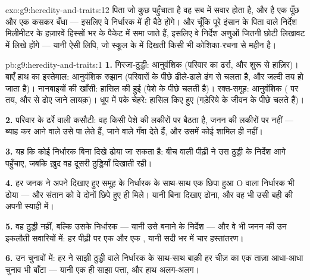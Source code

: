 \begin{solution}{exo:g9:heredity-and-traits:12}
पिता जो कुछ पहुँचाता है वह सब  में सवार होता है, और  है
एक पूँछ और एक कसकर बँधा  --- इसलिए वे निर्धारक  में ही
बैठे होंगे। और चूँकि पूरे इंसान के पिता वाले निर्देश मिलीमीटर के
हज़ारवें हिस्सों भर के पैकेट में समा जाते हैं, इसलिए वे निर्देश अणुओं
जितनी छोटी लिखावट में लिखे होंगे --- यानी ऐसी लिपि, जो स्कूल के
 में दिखती किसी भी कोशिका-रचना से महीन है।
\end{solution}

\begin{solution}{pb:g9:heredity-and-traits:1}
\textbf{1.} गिरजा-ठुड्डी: आनुवंशिक (परिवार का ढर्रा, और शुरू से
हाज़िर)। बाएँ हाथ का इस्तेमाल: आनुवंशिक रुझान (परिवारों के पीछे ढीले-ढाले
ढंग से चलता है, और जल्दी तय हो जाता है)। नानबाइयों की खाँसी: हासिल की हुई
(पेशे के पीछे चलती है)। रक्त-समूह: आनुवंशिक ( पर तय, और 
से ढोए जाने लायक़)। धूप में पके चेहरे: हासिल किए हुए (गड़ेरिये के जीवन के
पीछे चलते हैं)।

\textbf{2.} परिवार के ढर्रे वाली कसौटी: वह  किसी पेशे की लकीरों पर
बैठता है, जनन की लकीरों पर नहीं --- ब्याह कर आने वाले उसे पा लेते हैं,
जाने वाले गँवा देते हैं, और उसमें कोई  शामिल ही नहीं।

\textbf{3.} यह कि कोई निर्धारक बिना दिखे ढोया जा सकता है: बीच वाली पीढ़ी
ने उस ठुड्डी के निर्देश आगे पहुँचाए, जबकि ख़ुद वह दूसरी ठुड्डियाँ दिखाती
रही।

\textbf{4.} हर जनक ने अपने दिखाए हुए समूह के निर्धारक के साथ-साथ एक छिपा
हुआ O वाला निर्धारक भी ढोया --- और संतान को वे दोनों छिपे हुए ही मिले।
यानी बिना दिखाए ढोना, और वह भी उसी बही की अपनी स्याही में।

\textbf{5.} वह ठुड्डी नहीं, बल्कि उसके निर्धारक --- यानी उसे बनाने के
निर्देश --- और वे भी जनन की उन इकलौती सवारियों में: हर पीढ़ी पर एक
 और एक , यानी सदी भर में चार हस्तांतरण।

\textbf{6.} उन चुनावों में: हर  ने साझी ठुड्डी वाले निर्धारक के
साथ-साथ बाक़ी हर चीज़ का एक ताज़ा आधा-आधा चुनाव भी बाँटा --- यानी एक ही
साझा पत्ता, और हाथ अलग-अलग।


\end{solution}
